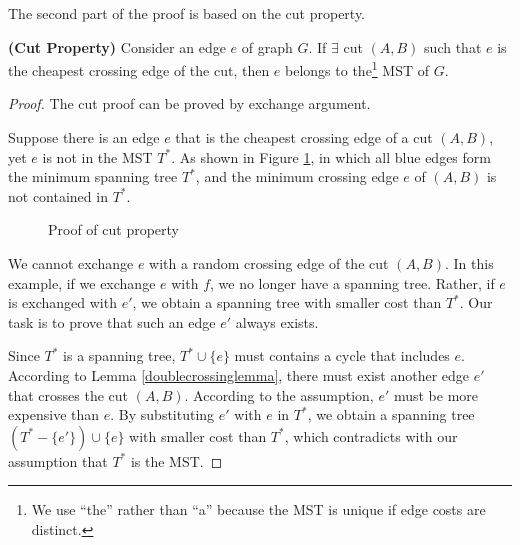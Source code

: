 The second part of the proof is based on the cut property.
\begin{theorem}
\textbf{(Cut Property)}
Consider an edge $e$ of graph $G$. If $\exists$ cut $(A,B)$ such that $e$ is the cheapest crossing edge of the cut, then $e$ belongs to the\footnote{We use ``the'' rather than ``a'' because the MST is unique if edge costs are distinct.} MST of $G$.
\end{theorem}
\begin{proof}
The cut proof can be proved by exchange argument.

Suppose there is an edge $e$ that is the cheapest crossing edge of a cut $(A,B)$, yet $e$ is not in the MST $T^*$. As shown in Figure \ref{proofcutproperty}, in which all blue edges form the minimum spanning tree $T^*$, and the minimum crossing edge $e$ of $(A,B)$ is not contained in $T^*$.
\begin{figure}[ht]
\centering
{}
\caption{Proof of cut property}\label{proofcutproperty}
\end{figure}

We cannot exchange $e$ with a random crossing edge of the cut $(A,B)$. In this example, if we exchange $e$ with $f$, we no longer have a spanning tree. Rather, if $e$ is exchanged with $e'$, we obtain a spanning tree with smaller cost than $T^*$. Our task is to prove that such an edge $e'$ always exists. 

Since $T^*$ is a spanning tree, $T^*\cup\{e\}$ must contains a cycle that includes $e$. According to Lemma \ref{doublecrossinglemma}, there must exist another edge $e'$ that crosses the cut $(A,B)$. According to the assumption, $e'$ must be more expensive than $e$. By substituting $e'$ with $e$ in $T^*$, we obtain a spanning tree $(T^*-\{e'\})\cup\{e\}$ with smaller cost than $T^*$, which contradicts with our assumption that $T^*$ is the MST.
\end{proof}


